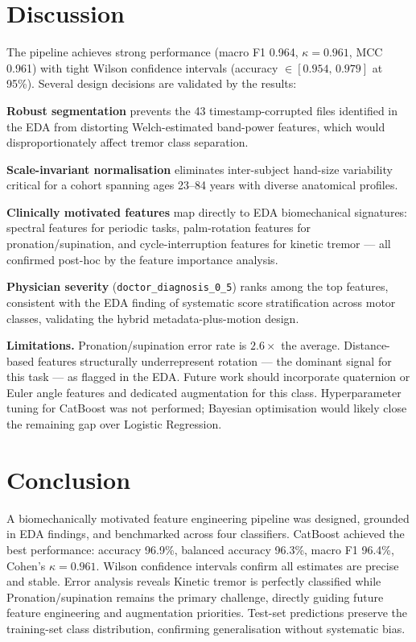 \documentclass[11pt,twocolumn]{article}
\begin{document}
\section{Discussion}
 
The pipeline achieves strong performance (macro F1 0.964, $\kappa = 0.961$, MCC 0.961) with tight Wilson confidence intervals (accuracy $\in [0.954,\, 0.979]$ at 95\%). Several design decisions are validated by the results:
 
\textbf{Robust segmentation} prevents the 43 timestamp-corrupted files identified in the EDA from distorting Welch-estimated band-power features, which would disproportionately affect tremor class separation.
 
\textbf{Scale-invariant normalisation} eliminates inter-subject hand-size variability critical for a cohort spanning ages 23--84 years with diverse anatomical profiles.
 
\textbf{Clinically motivated features} map directly to EDA biomechanical signatures: spectral features for periodic tasks, palm-rotation features for pronation/supination, and cycle-interruption features for kinetic tremor --- all confirmed post-hoc by the feature importance analysis.
 
\textbf{Physician severity} (\texttt{doctor\_diagnosis\_0\_5}) ranks among the top features, consistent with the EDA finding of systematic score stratification across motor classes, validating the hybrid metadata-plus-motion design.
 
\textbf{Limitations.} Pronation/supination error rate is $2.6\times$ the average. Distance-based features structurally underrepresent rotation --- the dominant signal for this task --- as flagged in the EDA. Future work should incorporate quaternion or Euler angle features and dedicated augmentation for this class. Hyperparameter tuning for CatBoost was not performed; Bayesian optimisation would likely close the remaining gap over Logistic Regression.
 
\section{Conclusion}
 
A biomechanically motivated feature engineering pipeline was designed, grounded in EDA findings, and benchmarked across four classifiers. CatBoost achieved the best performance: accuracy 96.9\%, balanced accuracy 96.3\%, macro F1 96.4\%, Cohen's $\kappa = 0.961$. Wilson confidence intervals confirm all estimates are precise and stable. Error analysis reveals Kinetic tremor is perfectly classified while Pronation/supination remains the primary challenge, directly guiding future feature engineering and augmentation priorities. Test-set predictions preserve the training-set class distribution, confirming generalisation without systematic bias.
 
\end{document}
